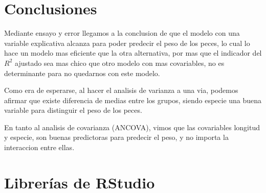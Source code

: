 \documentclass[
]{article}
\begin{document}
\section{Conclusiones}\label{conclusiones}

Mediante ensayo y error llegamos a la conclusion de que el modelo con
una variable explicativa alcanza para poder predecir el peso de los
peces, lo cual lo hace un modelo mas eficiente que la otra alternativa,
por mas que el indicador del \(R^2\) ajustado sea mas chico que otro
modelo con mas covariables, no es determinante para no quedarnos con
este modelo.

Como era de esperarse, al hacer el analisis de varianza a una via,
podemos afirmar que existe diferencia de medias entre los grupos, siendo
especie una buena variable para distinguir el peso de los peces.

En tanto al analisis de covarianza (ANCOVA), vimos que las covariables
longitud y especie, son buenas predictoras para predecir el peso, y no
importa la interaccion entre ellas.

\section{Librerías de RStudio}\label{libreruxedas-de-rstudio}
\end{document}
